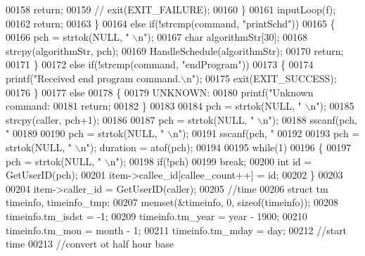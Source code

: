 \begin{DoxyCode}
{{{00158             \textcolor{keywordflow}{return};
00159             \textcolor{comment}{// exit(EXIT\_FAILURE);}
00160         \}
00161         inputLoop(f);
00162         \textcolor{keywordflow}{return};
00163     \}
00164     \textcolor{keywordflow}{else} \textcolor{keywordflow}{if}(!strcmp(command, \textcolor{stringliteral}{"printSchd"}))
00165     \{
00166         pch = strtok(NULL, \textcolor{stringliteral}{" \(\backslash\)n"});
00167         \textcolor{keywordtype}{char} algorithmStr[30];
00168         strcpy(algorithmStr, pch);
00169         HandleSchedule(algorithmStr);
00170         \textcolor{keywordflow}{return};
00171     \}
00172     \textcolor{keywordflow}{else} \textcolor{keywordflow}{if}(!strcmp(command, \textcolor{stringliteral}{"endProgram"}))
00173     \{
00174         printf(\textcolor{stringliteral}{"Received end program command.\(\backslash\)n"});
00175         exit(EXIT\_SUCCESS);
00176     \}
00177     \textcolor{keywordflow}{else}
00178     \{
00179         UNKNOWN:
00180         printf(\textcolor{stringliteral}{"Unknown command: %
00181         \textcolor{keywordflow}{return};
00182     \}
00183 
00184     pch = strtok(NULL, \textcolor{stringliteral}{" \(\backslash\)n"});
00185     strcpy(caller, pch+1);
00186 
00187     pch = strtok(NULL, \textcolor{stringliteral}{" \(\backslash\)n"});
00188     sscanf(pch, \textcolor{stringliteral}{"%
00189     
00190     pch = strtok(NULL, \textcolor{stringliteral}{" \(\backslash\)n"});
00191     sscanf(pch, \textcolor{stringliteral}{"%
00192     
00193     pch = strtok(NULL, \textcolor{stringliteral}{" \(\backslash\)n"}); duration = atof(pch);
00194 
00195     \textcolor{keywordflow}{while}(1)
00196     \{
00197         pch = strtok(NULL, \textcolor{stringliteral}{" \(\backslash\)n"});
00198         \textcolor{keywordflow}{if}(!pch)
00199             \textcolor{keywordflow}{break};
00200         \textcolor{keywordtype}{int} \textcolor{keywordtype}{id} = GetUserID(pch);
00201         item->callee_id[callee\_count++] = id;
00202     \}
00203 
00204     item->caller_id = GetUserID(caller);
00205     \textcolor{comment}{//time}
00206     \textcolor{keyword}{struct }tm timeinfo, timeinfo\_tmp;
00207     memset(&timeinfo, 0, \textcolor{keyword}{sizeof}(timeinfo));
00208     timeinfo.tm\_isdst = -1;
00209     timeinfo.tm\_year = year - 1900;
00210     timeinfo.tm\_mon = month - 1;
00211     timeinfo.tm\_mday = day;
00212     \textcolor{comment}{//start time}
00213     \textcolor{comment}{//convert ot half hour base}
}}}}}}
\end{DoxyCode}
